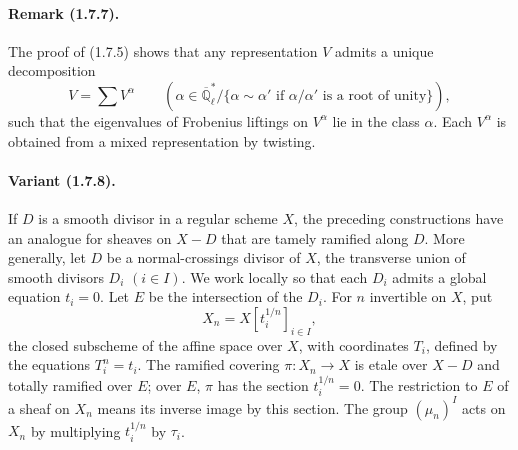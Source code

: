 \documentclass[11pt]{article}
\theoremstyle{remark}
\newcommand{\Qlb}{\overline{\mathbb{Q}}_\ell}
\begin{document}
\paragraph{Remark (1.7.7).}
The proof of (1.7.5) shows that any representation $V$ admits a unique decomposition
\[
V=\sum V^\alpha \qquad (\alpha\in \Qlb^*/\{\alpha\sim\alpha' \text{ if }\alpha/\alpha'\text{ is a root of unity}\}),
\]
such that the eigenvalues of Frobenius liftings on $V^\alpha$ lie in the class $\alpha$. Each $V^\alpha$ is obtained from a mixed representation by twisting.

\paragraph{Variant (1.7.8).}
If $D$ is a smooth divisor in a regular scheme $X$, the preceding constructions have an analogue for sheaves on $X-D$ that are tamely ramified along $D$. More generally, let $D$ be a normal-crossings divisor of $X$, the transverse union of smooth divisors $D_i$ $(i\in I)$. We work locally so that each $D_i$ admits a global equation $t_i=0$. Let $E$ be the intersection of the $D_i$. For $n$ invertible on $X$, put
\[
X_n=X[t_i^{1/n}]_{i\in I},
\]
the closed subscheme of the affine space over $X$, with coordinates $T_i$, defined by the equations $T_i^n=t_i$. The ramified covering $\pi:X_n\to X$ is etale over $X-D$ and totally ramified over $E$; over $E$, $\pi$ has the section $t_i^{1/n}=0$. The restriction to $E$ of a sheaf on $X_n$ means its inverse image by this section. The group $(\mu_n)^I$ acts on $X_n$ by multiplying $t_i^{1/n}$ by $\tau_i$.
\end{document}
